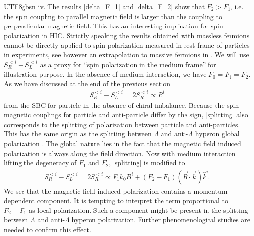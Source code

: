\documentclass[11pt]{article}\def\baselinestretch{1.4}
\def\L{{\Lambda}}
\begin{document}
\begin{CJK}{UTF8}{gbsn}
% 
iv. The results \eqref{delta_F_1} and \eqref{delta_F_2} show that $F_2>F_1$, i.e. the spin coupling to parallel magnetic field is larger than the coupling to perpendicular magnetic field. This has an interesting implication for spin polarization in HIC. Strictly speaking the results obtained with massless fermions cannot be directly applied to spin polarization measured in rest frame of particles in experiments, see however an extrapolation to massive fermions in \cite{Yi:2021ryh}. We will use $S_R^{<i}-S_L^{<i}$ as a proxy for ``spin polarization in the medium frame'' for illustration purpose. In the absence of medium interaction, we have $F_0=F_1=F_2$. As we have discussed at the end of the previous section
\begin{align}\label{splitting}
S_R^{<i}-S_L^{<i}=2S_R^{<i}\propto B^i
\end{align}
from the SBC for particle in the absence of chiral imbalance. Because the spin magnetic couplings for particle and anti-particle differ by the sign, \eqref{splitting} also corresponds to the splitting of polarization between particle and anti-particles. This has the same origin as the splitting between $\L$ and anti-$\L$ hyperon global polarization \cite{Becattini:2016gvu}. The global nature lies in the fact that the magnetic field induced polarization is always along the field direction. Now with medium interaction lifting the degeneracy of $F_1$ and $F_2$, \eqref{splitting} is modified to
\begin{align}\label{splitting2}
S_R^{<i}-S_L^{<i}=2S_R^{<i}\propto F_1k_0B^i+(F_2-F_1)(\vec{B}\cdot\vec{k})\hat{k}^i.
\end{align}
We see that the magnetic field induced polarization contains a momentum dependent component. It is tempting to interpret the term proportional to $F_2-F_1$ as local polarization. Such a component might be present in the splitting between $\L$ and anti-$\L$ hyperon polarization. Further phenomenological studies are needed to confirm this effect.




\end{CJK}
\end{document}
